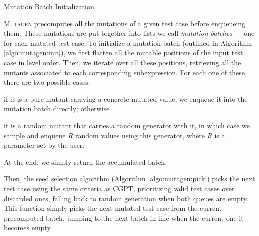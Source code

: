 \documentclass[sigconf,review,anonymous]{acmart}
\newcommand{\mutagen}{\textsc{Mutagen}\xspace}
\begin{document}
\begin{algorithm}[t]
  \SetAlgoLined
  \DontPrintSemicolon
\caption{\label{algo:mutagen:init}Mutation Batch Initialization}
\end{algorithm}



\mutagen precomputes all the mutations of a given test case before enqueueing
them.
%
These mutations are put together into lists we call \emph{mutation batches} ---
one for each mutated test case.
%
To initialize a mutation batch (outlined in Algorithm \ref{algo:mutagen:init}),
we first flatten all the mutable positions of the input test case in level order.
%
Then, we iterate over all these positions, retrieving all the mutants associated
to each corresponding subexpression.
%
For each one of these, there are two possible cases:
%
\begin{inparaenum}
\item if it is a pure mutant carrying a concrete mutated value, we enqueue it
  into the mutation batch directly; otherwise
\item it is a random mutant that carries a random generator with it, in which
  case we sample and enqueue \textit{R} random values using this generator,
  where \textit{R} is a parameter set by the user.
\end{inparaenum}
%
At the end, we simply return the accumulated batch.


Then, the seed selection algorithm (Algorithm \ref{algo:mutagen:pick}) picks
the next test case using the same criteria as CGPT, prioritizing valid test
cases over discarded ones, falling back to random generation when both queues
are empty.
%
This function simply picks the next mutated test case from the current
precomputed batch, jumping to the next batch in line when the current one it
becomes empty.
\end{document}
